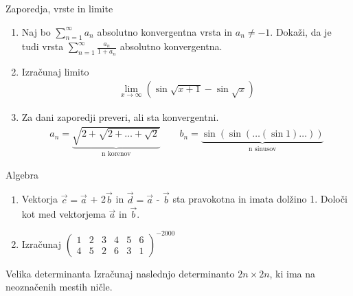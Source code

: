 \begin{frame}{Zaporedja, vrste in limite}
	\begin{enumerate}
		\item 
		Naj bo $\sum_{n=1}^\infty a_n$  absolutno konvergentna vrsta in $a_n \ne -1$.
		Dokaži, da je tudi vrsta $\sum_{n=1}^\infty \frac{a_n}{1+a_n}$
		absolutno konvergentna.

		\item
		Izračunaj limito
		\begin{align*}
			\lim\limits_{x \to \infty}(\sin {\sqrt{x+1}} - \sin {\sqrt{x}})
		\end{align*}

		\item
		Za dani zaporedji preveri, ali sta konvergentni.
		\begin{align*}
			a_n = \underbrace{\sqrt{2+\sqrt{2+\dots+\sqrt{2}}}}_\text{n korenov} \qquad
			b_n = \underbrace{\sin(\sin(\dots(\sin 1)\dots))}_\text{n sinusov}
		\end{align*}
	\end{enumerate}
\end{frame}

\begin{frame}{Algebra}
	\begin{enumerate}
		\item
		Vektorja $\vec{c} = \vec{a}$ + 2$\vec{b}$ in $\vec{d} = \vec{a}$ - $\vec{b}$
		sta pravokotna in imata dolžino 1. Določi kot med vektorjema $\vec{a}$ in $\vec{b}$.
		\item 
		Izračunaj
		$\begin{pmatrix}
			1 & 2 & 3 & 4 & 5 & 6 \\
			4 & 5 & 2 & 6 & 3 & 1
		\end{pmatrix}^{-2000}$
	\end{enumerate}
\end{frame}

\begin{frame}{Velika determinanta}
	Izračunaj naslednjo determinanto $2n \times 2n$, ki ima na neoznačenih mestih ničle.
	
\end{frame}

